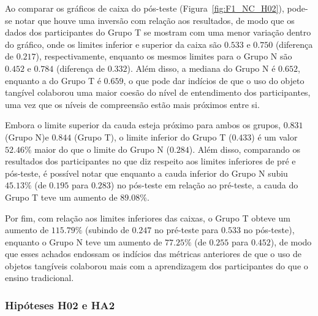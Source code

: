 Ao comparar os gráficos de caixa do pós-teste (Figura~\ref{fig:F1_NC_H02}), pode-se notar que houve uma inversão com relação aos resultados, de modo que os dados dos participantes do Grupo T se mostram com uma menor variação dentro do gráfico, onde os limites inferior e superior da caixa são $0.533$ e $0.750$ (diferença de $0.217$), respectivamente, enquanto os mesmos limites para o Grupo N são $0.452$ e $0.784$ (diferença de $0.332$). Além disso, a mediana do Grupo N é $0.652$, enquanto a do Grupo T é $0.659$, o que pode dar indícios de que o uso do objeto tangível colaborou uma maior coesão do nível de entendimento dos participantes, uma vez que os níveis de compreensão estão mais próximos entre si. 

Embora o limite superior da cauda esteja próximo para ambos os grupos, $0.831$ (Grupo N)e $0.844$ (Grupo T), o limite inferior do Grupo T ($0.433$) é um valor $52.46\%$ maior do que o limite do Grupo N ($0.284$). Além disso, comparando os resultados dos participantes no que diz respeito aos limites inferiores de pré e pós-teste, é possível notar que enquanto a cauda inferior do Grupo N subiu $45.13\%$ (de $0.195$ para $0.283$) no pós-teste em relação ao pré-teste, a cauda do Grupo T teve um aumento de $89.08\%$. 

Por fim, com relação aos limites inferiores das caixas, o Grupo T obteve um aumento de $115.79\%$ (subindo de $0.247$ no pré-teste para $0.533$ no pós-teste), enquanto o Grupo N teve um aumento de $77.25\%$ (de $0.255$ para $0.452$), de modo que esses achados endossam os indícios das métricas anteriores de que o uso de objetos tangíveis colaborou mais com a aprendizagem dos participantes do que o ensino tradicional.



\subsubsection{Hipóteses H02 e HA2}

